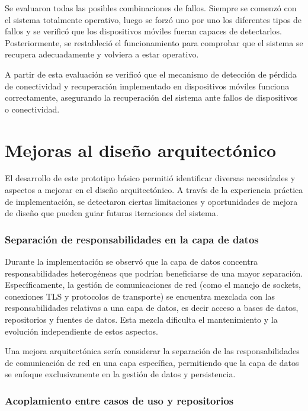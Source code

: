     Se evaluaron todas las posibles combinaciones de fallos. Siempre se comenzó con el sistema totalmente operativo, luego se forzó uno por uno los diferentes tipos de fallos y se verificó que los dispositivos móviles fueran capaces de detectarlos. Posteriormente, se restableció el funcionamiento para comprobar que el sistema se recupera adecuadamente y volviera a estar operativo.
    
    A partir de esta evaluación se verificó que el mecanismo de detección de pérdida de conectividad y recuperación implementado en dispositivos móviles funciona correctamente, asegurando la recuperación del sistema ante fallos de dispositivos o conectividad.

\section{Mejoras al diseño arquitectónico}

El desarrollo de este prototipo básico permitió identificar diversas necesidades y aspectos a mejorar en el diseño arquitectónico. A través de la experiencia práctica de implementación, se detectaron ciertas limitaciones y oportunidades de mejora de diseño que pueden guiar futuras iteraciones del sistema.

\subsubsection{Separación de responsabilidades en la capa de datos}

Durante la implementación se observó que la capa de datos concentra responsabilidades heterogéneas que podrían beneficiarse de una mayor separación. Específicamente, la gestión de comunicaciones de red (como el manejo de sockets, conexiones TLS y protocolos de transporte) se encuentra mezclada con las responsabilidades relativas a una capa de datos, es decir acceso a bases de datos, repositorios y fuentes de datos. Esta mezcla dificulta el mantenimiento y la evolución independiente de estos aspectos.

Una mejora arquitectónica sería considerar la separación de las responsabilidades de comunicación de red en una capa específica, permitiendo que la capa de datos se enfoque exclusivamente en la gestión de datos y persistencia.

\subsubsection{Acoplamiento entre casos de uso y repositorios}

